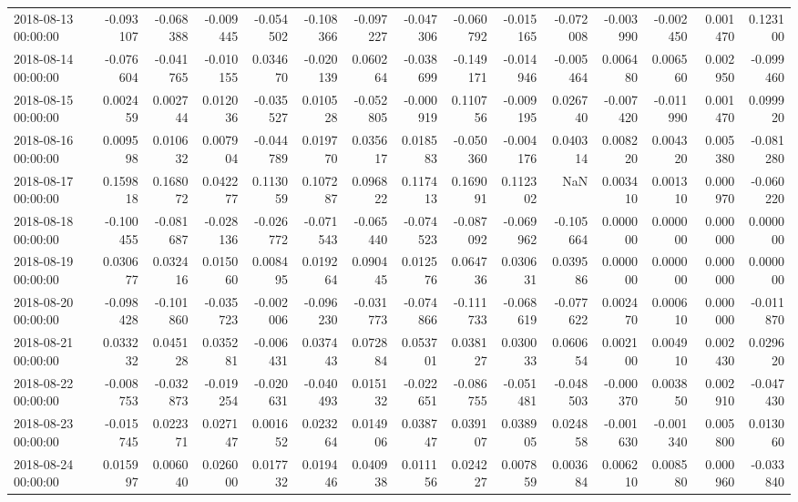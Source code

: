 \begin{tabular}{lrrrrrrrrrrrrrr}
2018-08-13 00:00:00 & -0.093107 & -0.068388 & -0.009445 & -0.054502 & -0.108366 & -0.097227 & -0.047306 & -0.060792 & -0.015165 & -0.072008 & -0.003990 & -0.002450 & 0.001470 & 0.123100 \\
2018-08-14 00:00:00 & -0.076604 & -0.041765 & -0.010155 & 0.034670 & -0.020139 & 0.060264 & -0.038699 & -0.149171 & -0.014946 & -0.005464 & 0.006480 & 0.006560 & 0.002950 & -0.099460 \\
2018-08-15 00:00:00 & 0.002459 & 0.002744 & 0.012036 & -0.035527 & 0.010528 & -0.052805 & -0.000919 & 0.110756 & -0.009195 & 0.026740 & -0.007420 & -0.011990 & 0.001470 & 0.099920 \\
2018-08-16 00:00:00 & 0.009598 & 0.010632 & 0.007904 & -0.044789 & 0.019770 & 0.035617 & 0.018583 & -0.050360 & -0.004176 & 0.040314 & 0.008220 & 0.004320 & 0.005380 & -0.081280 \\
2018-08-17 00:00:00 & 0.159818 & 0.168072 & 0.042277 & 0.113059 & 0.107287 & 0.096822 & 0.117413 & 0.169091 & 0.112302 & NaN & 0.003410 & 0.001310 & 0.000970 & -0.060220 \\
2018-08-18 00:00:00 & -0.100455 & -0.081687 & -0.028136 & -0.026772 & -0.071543 & -0.065440 & -0.074523 & -0.087092 & -0.069962 & -0.105664 & 0.000000 & 0.000000 & 0.000000 & 0.000000 \\
2018-08-19 00:00:00 & 0.030677 & 0.032416 & 0.015060 & 0.008495 & 0.019264 & 0.090445 & 0.012576 & 0.064736 & 0.030631 & 0.039586 & 0.000000 & 0.000000 & 0.000000 & 0.000000 \\
2018-08-20 00:00:00 & -0.098428 & -0.101860 & -0.035723 & -0.002006 & -0.096230 & -0.031773 & -0.074866 & -0.111733 & -0.068619 & -0.077622 & 0.002470 & 0.000610 & 0.000000 & -0.011870 \\
2018-08-21 00:00:00 & 0.033232 & 0.045128 & 0.035281 & -0.006431 & 0.037443 & 0.072884 & 0.053701 & 0.038127 & 0.030033 & 0.060654 & 0.002100 & 0.004910 & 0.002430 & 0.029620 \\
2018-08-22 00:00:00 & -0.008753 & -0.032873 & -0.019254 & -0.020631 & -0.040493 & 0.015132 & -0.022651 & -0.086755 & -0.051481 & -0.048503 & -0.000370 & 0.003850 & 0.002910 & -0.047430 \\
2018-08-23 00:00:00 & -0.015745 & 0.022371 & 0.027147 & 0.001652 & 0.023264 & 0.014906 & 0.038747 & 0.039107 & 0.038905 & 0.024858 & -0.001630 & -0.001340 & 0.005800 & 0.013060 \\
2018-08-24 00:00:00 & 0.015997 & 0.006040 & 0.026000 & 0.017732 & 0.019446 & 0.040938 & 0.011156 & 0.024227 & 0.007859 & 0.003684 & 0.006210 & 0.008580 & 0.000960 & -0.033840 \\

\end{tabular}
